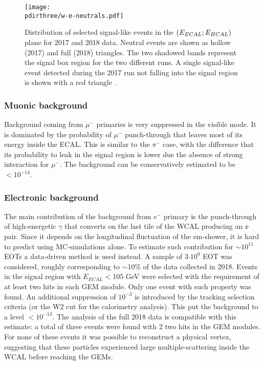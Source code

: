 \begin{figure}[bth!]
  \centering
  \texttt{[image: \\pdirthree/w-e-neutrals.pdf]}
  \caption[neutral events in visible mode]{Distribution of selected signal-like events in the $(E_{ECAL};E_{HCAL})$ plane for 2017 and 2018 data. Neutral events are shown as hollow (2017) and full (2018) triangles. The two shadowed bands represent the signal box region for the two different runs. A single signal-like event detected during the 2017 run not falling into the signal region is shown with a red triangle \cite{Banerjee:2019hmi}.}
  \label{fig:w-e-vis}
\end{figure}

\subsubsection{Muonic background}
\label{ch3:sec:bkg:vis:muon}

Background coming from $\mu^-$ primaries is very suppressed in the visible mode. It is dominated by the probability of $\mu^-$ punch-through that leaves most of its energy inside the ECAL. This is similar to the $\pi^-$ case, with the difference that its probability to leak in the signal region is lower due the absence of strong interaction for $\mu^-$. The background can be conservatively estimated to be $<10^{-14}$.

\subsubsection{Electronic background}
\label{ch3:sec:bkg:vis:elec}

The main contribution of the background from $e^-$ primary is the punch-through of high-energetic $\gamma$ that converts on the last tile of the WCAL producing an $\ee$ pair. Since it depends on the longitudinal fluctuation of the em-shower, it is hard to predict using MC-simulations alone. To estimate such contribution for $\sim10^{11}$ EOTs a data-driven method is used instead. A sample of 3$\cdot 10^9$ EOT was considered, roughly corresponding to $\sim$10\% of the data collected in 2018. Events in the signal region with $E_{ECAL} < 105$ GeV were selected with the requirement of at least two hits in each GEM module. Only one event with such property was found. An additional suppression of $10^{-3}$ is introduced by the tracking selection criteria (or the W2 cut for the calorimetry analysis). This put the background to a level $<10^{-13}$. The analysis of the full 2018 data is compatible with this estimate: a total of three events were found with 2 two hits in the GEM modules. For none of these events it was possible to reconstruct a physical vertex, suggesting that these particles experienced large multiple-scattering inside the WCAL before reaching the GEMs.


